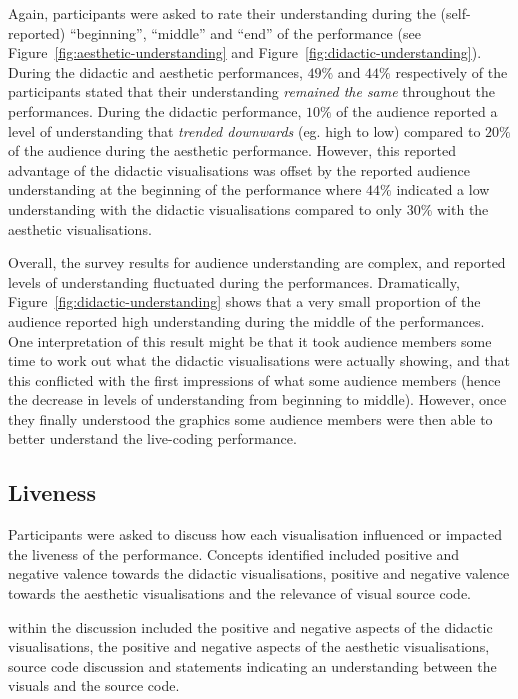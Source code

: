 Again, participants were asked to rate their understanding during the (self-reported) ``beginning'', ``middle'' and ``end'' of the performance (see Figure~\ref{fig:aesthetic-understanding} and Figure~\ref{fig:didactic-understanding}). During the didactic and aesthetic performances, $49\%$ and $44\%$ respectively of the participants stated that their understanding \emph{remained the same} throughout the performances. During the didactic performance, $10\%$ of the audience reported a level of understanding that \emph{trended downwards} (eg. high to low) compared to $20\%$ of the audience during the aesthetic performance. However, this reported advantage of the didactic visualisations was offset by the reported audience understanding at the beginning of the performance where $44\%$ indicated a low understanding with the didactic visualisations compared to only $30\%$ with the aesthetic visualisations. 

Overall, the survey results for audience understanding are complex, and reported levels of understanding fluctuated during the performances. Dramatically, Figure~\ref{fig:didactic-understanding} shows that a very small proportion of the audience reported high understanding during the middle of the performances. One interpretation of this result might be that it took audience members some time to work out what the didactic visualisations were actually showing, and that this conflicted with the first impressions of what some audience members (hence the decrease in levels of understanding from beginning to middle). However, once they finally understood the graphics some audience members were then able to better understand the live-coding performance.

\subsection{Liveness}

Participants were asked to discuss how each visualisation influenced or impacted the liveness of the performance. Concepts identified included positive and negative valence towards the didactic visualisations, positive and negative valence towards the aesthetic visualisations and the relevance of visual source code. 

within the discussion included the positive and negative aspects of the didactic visualisations, the positive and negative aspects of the aesthetic visualisations, source code discussion and statements indicating an understanding between the visuals and the source code.

